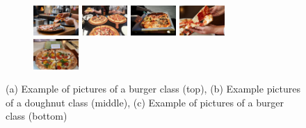 \documentclass[10pt]{article}
\begin{document}
\begin{figure}[H]
				\vspace{5pt}
				\begin{subfigure}[b]{1.025\textwidth}
					\includegraphics[width=0.19\textwidth]{images/data/pizza2/1.jpg}
					\includegraphics[width=0.19\textwidth]{images/data/pizza2/2.png}
					\includegraphics[width=0.19\textwidth]{images/data/pizza2/3.jpg}
					\includegraphics[width=0.19\textwidth]{images/data/pizza2/4.jpg}
					\includegraphics[width=0.19\textwidth]{images/data/pizza2/5.jpg}
       				\end{subfigure}
       				
				\caption[Example of pictures of a burger, doughnut and pizza class]{(a) Example of pictures of a burger class (top), (b) Example pictures of a doughnut class (middle), (c) Example of pictures of a burger class (bottom)}
				\label{fig:class_burger_doughnut_pizza}
			\end{figure}
\end{document}
